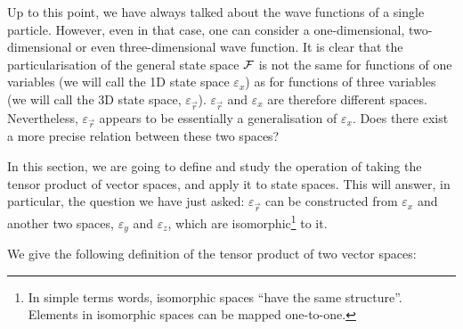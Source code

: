 Up to this point, we have always talked about the wave functions of a single particle. However, even in that case, one can consider a one-dimensional, two-dimensional or even three-dimensional wave function. It is clear that the particularisation of the general state space $\mathcal{F}$ is not the same for functions of one variables (we will call the 1D state space $\varepsilon_x$) as for functions of three variables (we will call the 3D state space, $\varepsilon_{\vec{r}}$). $\varepsilon_{\vec{r}}$ and $\varepsilon_x$ are therefore different spaces. Nevertheless, $\varepsilon_{\vec{r}}$ appears to be essentially a generalisation of $\varepsilon_x$. Does there exist a more precise relation between these two spaces?

In this section, we are going to define and study the operation of taking the tensor product of vector spaces, and apply it to state spaces. This will answer, in particular, the question we have just asked: $\varepsilon_{\vec{r}}$ can be constructed from $\varepsilon_x$ and another two spaces, $\varepsilon_y$ and $\varepsilon_z$, which are isomorphic\footnote{In simple terms words, isomorphic spaces ``have the same structure''. Elements in isomorphic spaces can be mapped one-to-one.} to it. 

We give the following definition of the tensor product of two vector spaces:

